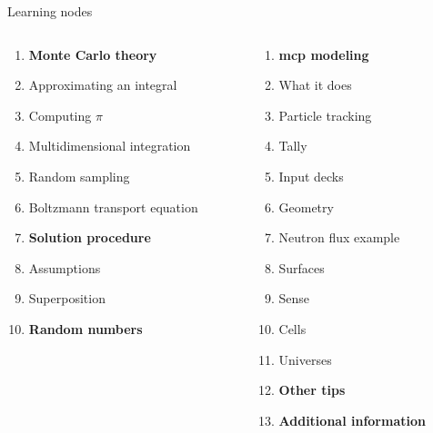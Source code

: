 \documentclass[aspectratio=1610,pdftex,dvipsnames,compress,xcolor={dvipsnames}]{beamer}
\newcommand{\acs}{\acrshort} %
\begin{document}
\begin{frame}{Learning nodes}
    \begin{columns}[t]

        \begin{column}{0.50\textwidth}
            \begin{enumerate}[series=outerlist,topsep=0pt,itemsep=1pt,leftmargin=*,label=(\arabic*)]
                \item[]\textbf{Monte Carlo theory}
                \item[]Approximating an integral  
                \item[]Computing $\pi$
                \item[]Multidimensional integration
                \item[]Random sampling
                \item[]Boltzmann transport equation
                    \vspace{0.15in}
                \item[]\textbf{Solution procedure}
                \item[]Assumptions
                \item[]Superposition
                    \vspace{0.15in}
                \item[]\textbf{Random numbers}
            \end{enumerate}
        \end{column}

        \begin{column}{0.50\textwidth}
            \begin{enumerate}[series=outerlist,topsep=0pt,itemsep=1pt,leftmargin=*,label=(\arabic*)]
                \item[]\hfill\textbf{\acs{mcp} modeling}
                \item[]\hfill What it does
                \item[]\hfill Particle tracking
                \item[]\hfill Tally
                \item[]\hfill Input decks
                \item[]\hfill Geometry
                \item[]\hfill Neutron flux example
                \item[]\hfill Surfaces
                \item[]\hfill Sense
                \item[]\hfill Cells
                \item[]\hfill Universes
                    \vspace{0.15in}
                \item[]\hfill\textbf{Other tips}
                    \vspace{0.15in}
                \item[]\hfill\textbf{Additional information}
            \end{enumerate}
        \end{column}

    \end{columns}
\end{frame}
\end{document}
